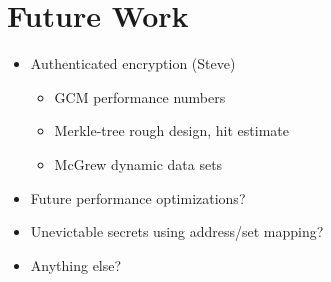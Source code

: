 \section{Future Work}
\label{sec:future}

\begin{itemize}
  \item Authenticated encryption (Steve)
    \begin{itemize}
      \item GCM performance numbers
      \item Merkle-tree rough design, hit estimate
      \item McGrew dynamic data sets
    \end{itemize}

  \item Future performance optimizations?
  \item Unevictable secrets using address/set mapping?
  \item Anything else?
\end{itemize}
